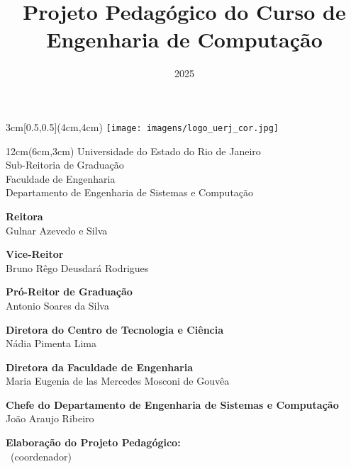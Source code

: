 \documentclass[oneside,envcountsame,envcountchap,openany]{svmono}
\begin{document}


\begin{textblock*}{3cm}[0.5,0.5](4cm,4cm)
	\texttt{[image: imagens/logo\_uerj\_cor.jpg]}
\end{textblock*}
\begin{textblock*}{12cm}(6cm,3cm)   %
	Universidade do Estado do Rio de Janeiro\\
	Sub-Reitoria de Graduação \\
	Faculdade de Engenharia\\
	Departamento de Engenharia de Sistemas e Computação
\end{textblock*}

\title{Projeto Pedagógico do Curso de Engenharia de Computação}
\subtitle{2025}
\date{} %
\maketitle
\vfill
\thispagestyle{empty} %
\newpage

{\textbf{Reitora}} \\
Gulnar Azevedo e Silva


	{\textbf{Vice-Reitor}} \\
Bruno Rêgo Deusdará Rodrigues

	{\textbf{Pró-Reitor de Graduação}} \\
Antonio Soares da Silva

	{\textbf{Diretora do Centro de Tecnologia e Ciência}} \\
Nádia Pimenta Lima

	{\textbf{Diretora da Faculdade de Engenharia}} \\
Maria Eugenia de las Mercedes Mosconi de Gouvêa

{\textbf{Chefe do Departamento de Engenharia de Sistemas e Computação}} \\
João Araujo Ribeiro

\thispagestyle{empty}

\vspace*{\fill}


\textbf{Elaboração do Projeto Pedagógico:}\\[0.5em]
\araujo~(coordenador)\\
\cristiana\\ \felipe\\ \gabriel\\ \giomar\\ \luiza\\ \luigi\\ \margareth\\ \rafaela\\ \robert\\ \silas\\ \simone\\ \thiago\\[1em]
\end{document}
